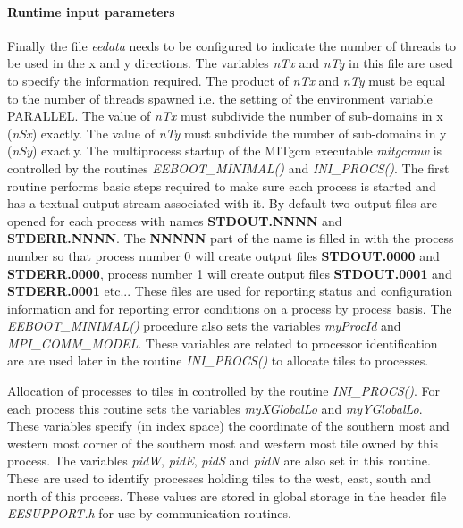 \paragraph{Runtime input parameters}
Finally the file {\em eedata} needs to be configured to indicate
the number of threads to be used in the x and y directions.
The variables {\em nTx} and {\em nTy} in this file are used to
specify the information required. The product of {\em nTx} and
{\em nTy} must be equal to the number of threads spawned i.e.
the setting of the environment variable PARALLEL.
The value of {\em nTx} must subdivide the number of sub-domains
in x ({\em nSx}) exactly. The value of {\em nTy} must subdivide the 
number of sub-domains in y ({\em nSy}) exactly. 
The multiprocess startup of the MITgcm executable {\em mitgcmuv}
is controlled by the routines {\em EEBOOT\_MINIMAL()} and
{\em INI\_PROCS()}. The first routine performs basic steps required
to make sure each process is started and has a textual output
stream associated with it. By default two output files are opened
for each process with names {\bf STDOUT.NNNN} and {\bf STDERR.NNNN}.
The {\bf NNNNN} part of the name is filled in with the process
number so that process number 0 will create output files
{\bf STDOUT.0000} and {\bf STDERR.0000}, process number 1 will create
output files {\bf STDOUT.0001} and {\bf STDERR.0001} etc... These files
are used for reporting status and configuration information and
for reporting error conditions on a process by process basis.
The {\em EEBOOT\_MINIMAL()} procedure also sets the variables 
{\em myProcId} and {\em MPI\_COMM\_MODEL}.
These variables are related
to processor identification are are used later in the routine
{\em INI\_PROCS()} to allocate tiles to processes.

Allocation of processes to tiles in controlled by the routine
{\em INI\_PROCS()}. For each process this routine sets
the variables {\em myXGlobalLo} and {\em myYGlobalLo}.
These variables specify (in index space) the coordinate
of the southern most and western most corner of the 
southern most and western most tile owned by this process.
The variables {\em pidW}, {\em pidE}, {\em pidS} and {\em pidN}
are also set in this routine. These are used to identify
processes holding tiles to the west, east, south and north 
of this process. These values are stored in global storage
in the header file {\em EESUPPORT.h} for use by
communication routines.
\\

